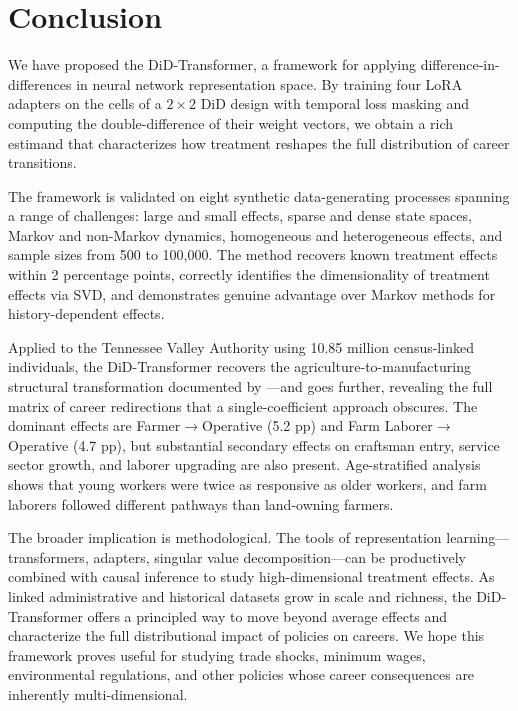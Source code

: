 \documentclass[12pt]{article}
\begin{document}
\section{Conclusion}\label{sec:conclusion}

We have proposed the DiD-Transformer, a framework for applying difference-in-differences in neural network representation space. By training four LoRA adapters on the cells of a $2 \times 2$ DiD design with temporal loss masking and computing the double-difference of their weight vectors, we obtain a rich estimand that characterizes how treatment reshapes the full distribution of career transitions.

The framework is validated on eight synthetic data-generating processes spanning a range of challenges: large and small effects, sparse and dense state spaces, Markov and non-Markov dynamics, homogeneous and heterogeneous effects, and sample sizes from 500 to 100,000. The method recovers known treatment effects within 2 percentage points, correctly identifies the dimensionality of treatment effects via SVD, and demonstrates genuine advantage over Markov methods for history-dependent effects.

Applied to the Tennessee Valley Authority using 10.85 million census-linked individuals, the DiD-Transformer recovers the agriculture-to-manufacturing structural transformation documented by \citet{klineMoretti2014local}---and goes further, revealing the full matrix of career redirections that a single-coefficient approach obscures. The dominant effects are Farmer$\to$Operative (5.2 pp) and Farm Laborer$\to$Operative (4.7 pp), but substantial secondary effects on craftsman entry, service sector growth, and laborer upgrading are also present. Age-stratified analysis shows that young workers were twice as responsive as older workers, and farm laborers followed different pathways than land-owning farmers.

The broader implication is methodological. The tools of representation learning---transformers, adapters, singular value decomposition---can be productively combined with causal inference to study high-dimensional treatment effects. As linked administrative and historical datasets grow in scale and richness, the DiD-Transformer offers a principled way to move beyond average effects and characterize the full distributional impact of policies on careers. We hope this framework proves useful for studying trade shocks, minimum wages, environmental regulations, and other policies whose career consequences are inherently multi-dimensional.
\end{document}
